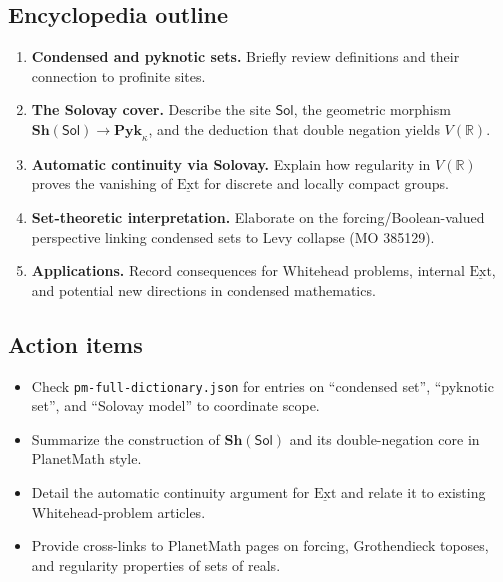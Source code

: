 \subsection*{Encyclopedia outline}
\begin{enumerate}
  \item \textbf{Condensed and pyknotic sets.} Briefly review definitions and their connection to profinite sites.
  \item \textbf{The Solovay cover.} Describe the site $\mathsf{Sol}$, the geometric morphism $\mathbf{Sh}(\mathsf{Sol}) \to \mathbf{Pyk}_\kappa$, and the deduction that double negation yields $V(\mathbb{R})$.
  \item \textbf{Automatic continuity via Solovay.} Explain how regularity in $V(\mathbb{R})$ proves the vanishing of $\underline{\mathrm{Ext}}$ for discrete and locally compact groups.
  \item \textbf{Set-theoretic interpretation.} Elaborate on the forcing/Boolean-valued perspective linking condensed sets to Levy collapse (MO 385129).
  \item \textbf{Applications.} Record consequences for Whitehead problems, internal $\underline{\mathrm{Ext}}$, and potential new directions in condensed mathematics.
\end{enumerate}
\subsection*{Action items}
\begin{itemize}
  \item Check \texttt{pm-full-dictionary.json} for entries on ``condensed set'', ``pyknotic set'', and ``Solovay model'' to coordinate scope.
  \item Summarize the construction of $\mathbf{Sh}(\mathsf{Sol})$ and its double-negation core in PlanetMath style.
  \item Detail the automatic continuity argument for $\underline{\mathrm{Ext}}$ and relate it to existing Whitehead-problem articles.
  \item Provide cross-links to PlanetMath pages on forcing, Grothendieck toposes, and regularity properties of sets of reals.
\end{itemize}
